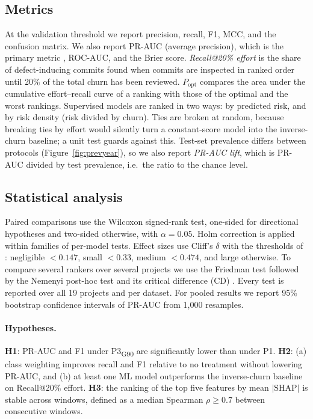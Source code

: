 \documentclass[11pt,a4paper]{article}
\newcommand{\pthree}{P3\textsubscript{G90}}
\begin{document}
\subsection{Metrics}\label{sec:metrics}

At the validation threshold we report precision, recall, F1, MCC, and the confusion matrix. We also report PR-AUC (average precision), which is the primary metric \citep{saito2015}, ROC-AUC, and the Brier score. \emph{Recall@20\% effort} is the share of defect-inducing commits found when commits are inspected in ranked order until 20\% of the total churn has been reviewed. $P_{\text{opt}}$ \citep{kamei2013} compares the area under the cumulative effort--recall curve of a ranking with those of the optimal and the worst rankings. Supervised models are ranked in two ways: by predicted risk, and by risk density (risk divided by churn). Ties are broken at random, because breaking ties by effort would silently turn a constant-score model into the inverse-churn baseline; a unit test guards against this. Test-set prevalence differs between protocols (Figure~\ref{fig:prevyear}), so we also report \emph{PR-AUC lift}, which is PR-AUC divided by test prevalence, i.e.\ the ratio to the chance level.

\subsection{Statistical analysis}\label{sec:stats}

Paired comparisons use the Wilcoxon signed-rank test, one-sided for directional hypotheses and two-sided otherwise, with $\alpha=0.05$. Holm correction \citep{holm1979} is applied within families of per-model tests. Effect sizes use Cliff's $\delta$ with the thresholds of \citet{romano2006}: negligible $<0.147$, small $<0.33$, medium $<0.474$, and large otherwise. To compare several rankers over several projects we use the Friedman test followed by the Nemenyi post-hoc test and its critical difference (CD) \citep{demsar2006}. Every test is reported over all 19 projects and per dataset. For pooled results we report 95\% bootstrap confidence intervals of PR-AUC from 1{,}000 resamples.

\paragraph{Hypotheses.}
\textbf{H1}: PR-AUC and F1 under \pthree{} are significantly lower than under P1.
\textbf{H2}: (a) class weighting improves recall and F1 relative to no treatment without lowering PR-AUC, and (b) at least one ML model outperforms the inverse-churn baseline on Recall@20\% effort.
\textbf{H3}: the ranking of the top five features by mean $|\text{SHAP}|$ is stable across windows, defined as a median Spearman $\rho\ge0.7$ between consecutive windows.
\end{document}
